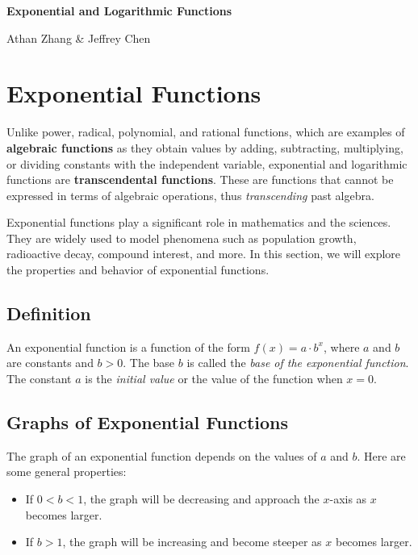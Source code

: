 \documentclass[11pt]{article}
\begin{document}
\textbf{\Huge Exponential and Logarithmic \newline Functions}

Athan Zhang \& Jeffrey Chen

\section{Exponential Functions}

Unlike power, radical, polynomial, and rational functions, which are examples of \textbf{algebraic functions} as they obtain values by adding, subtracting, multiplying, or dividing constants with the independent variable, exponential and logarithmic functions are \textbf{transcendental functions}. These are functions that cannot be expressed in terms of algebraic operations, thus \textit{transcending} past algebra. 

Exponential functions play a significant role in mathematics and the sciences. They are widely used to model phenomena such as population growth, radioactive decay, compound interest, and more. In this section, we will explore the properties and behavior of exponential functions.

\subsection{Definition}

An exponential function is a function of the form $f(x) = a \cdot b^x$, where $a$ and $b$ are constants and $b > 0$. The base $b$ is called the \textit{base of the exponential function}. The constant $a$ is the \textit{initial value} or the value of the function when $x = 0$.

\subsection{Graphs of Exponential Functions}

The graph of an exponential function depends on the values of $a$ and $b$. Here are some general properties:

\begin{itemize}
  \item If $0 < b < 1$, the graph will be decreasing and approach the $x$-axis as $x$ becomes larger.
  \item If $b > 1$, the graph will be increasing and become steeper as $x$ becomes larger.
\end{itemize}
\end{document}
